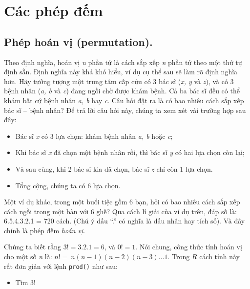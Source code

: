 \documentclass[
]{book}
\providecommand{\tightlist}{%
  \setlength{\itemsep}{0pt}\setlength{\parskip}{0pt}}
\begin{document}
\hypertarget{cuxe1c-phuxe9p-ux111ux1ebfm}{%
\section{Các phép đếm}\label{cuxe1c-phuxe9p-ux111ux1ebfm}}

\hypertarget{phuxe9p-houxe1n-vux1ecb-permutation.}{%
\subsection{Phép hoán vị (permutation).}\label{phuxe9p-houxe1n-vux1ecb-permutation.}}

Theo định nghĩa, hoán vị \emph{n} phần tử là cách sắp xếp \emph{n} phần tử theo một thứ tự định sẵn. Định nghĩa này khá khó hiểu, ví dụ cụ thể sau sẽ làm rõ định nghĩa hơn. Hãy tưởng tượng một trung tâm cấp cứu có 3 bác sĩ (\emph{x, y} và \emph{z}), và có 3 bệnh nhân (\emph{a, b} và \emph{c}) đang ngồi chờ được khám bệnh. Cả ba bác sĩ đều có thể khám bất cứ bệnh nhân \emph{a, b} hay \emph{c}. Câu hỏi đặt ra là có bao nhiêu cách sắp xếp bác sĩ -- bệnh nhân? Để trả lời câu hỏi này, chúng ta xem xét vài trường hợp sau đây:

\begin{itemize}
\item
  Bác sĩ \emph{x} có 3 lựa chọn: khám bệnh nhân \emph{a, b} hoặc \emph{c};
\item
  Khi bác sĩ \emph{x} đã chọn một bệnh nhân rồi, thì bác sĩ \emph{y} có hai lựa chọn còn lại;
\item
  Và sau cùng, khi 2 bác sĩ kia đã chọn, bác sĩ \emph{z} chỉ còn 1 lựa chọn.
\item
  Tổng cộng, chúng ta có 6 lựa chọn.
\end{itemize}

Một ví dụ khác, trong một buổi tiệc gồm 6 bạn, hỏi có bao nhiêu cách sắp xếp cách ngồi trong một bàn với 6 ghế? Qua cách lí giải của ví dụ trên, đáp số là: 6.5.4.3.2.1 = 720 cách. (Chú ý dấu ``.'' có nghĩa là dấu nhân hay tích số). Và đây chính là phép đếm \emph{hoán vị}.

Chúng ta biết rằng \(3! = 3.2.1 = 6\), và \(0!=1\). Nói chung, công thức tính hoán vị cho một số \emph{n} là: \(n! = \ n\left( n - 1 \right)\left( n - 2 \right)\left( n - 3 \right)\ldots 1\). Trong \(R\) cách tính này rất đơn giản với lệnh \texttt{prod()} như sau:

\begin{itemize}
\tightlist
\item
  Tìm 3!
\end{itemize}
\end{document}
